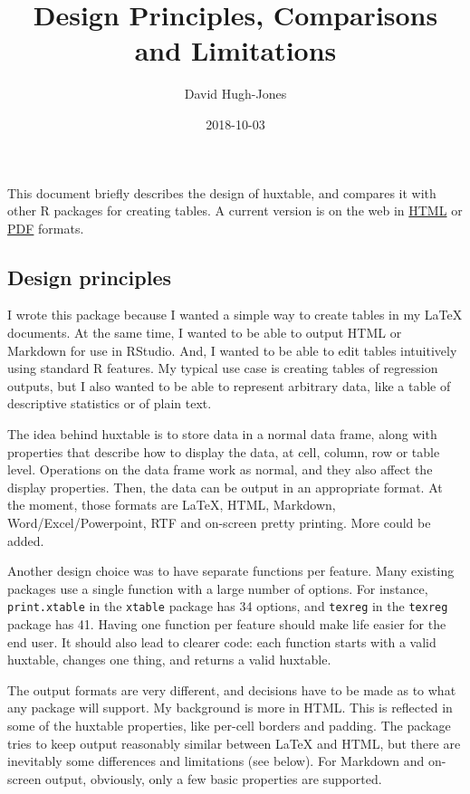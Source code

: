 \documentclass[]{article}
\title{Design Principles, Comparisons and Limitations}
\author{David Hugh-Jones}
\date{2018-10-03}
\begin{document}
\maketitle

This document briefly describes the design of huxtable, and compares it
with other R packages for creating tables. A current version is on the
web in
\href{http://hughjonesd.github.io/huxtable/design-principles.html}{HTML}
or
\href{http://hughjonesd.github.io/huxtable/design-principles.pdf}{PDF}
formats.

\subsection{Design principles}\label{design-principles}

I wrote this package because I wanted a simple way to create tables in
my LaTeX documents. At the same time, I wanted to be able to output HTML
or Markdown for use in RStudio. And, I wanted to be able to edit tables
intuitively using standard R features. My typical use case is creating
tables of regression outputs, but I also wanted to be able to represent
arbitrary data, like a table of descriptive statistics or of plain text.

The idea behind huxtable is to store data in a normal data frame, along
with properties that describe how to display the data, at cell, column,
row or table level. Operations on the data frame work as normal, and
they also affect the display properties. Then, the data can be output in
an appropriate format. At the moment, those formats are LaTeX, HTML,
Markdown, Word/Excel/Powerpoint, RTF and on-screen pretty printing. More
could be added.

Another design choice was to have separate functions per feature. Many
existing packages use a single function with a large number of options.
For instance, \texttt{print.xtable} in the \texttt{xtable} package has
34 options, and \texttt{texreg} in the \texttt{texreg} package has 41.
Having one function per feature should make life easier for the end
user. It should also lead to clearer code: each function starts with a
valid huxtable, changes one thing, and returns a valid huxtable.

The output formats are very different, and decisions have to be made as
to what any package will support. My background is more in HTML. This is
reflected in some of the huxtable properties, like per-cell borders and
padding. The package tries to keep output reasonably similar between
LaTeX and HTML, but there are inevitably some differences and
limitations (see below). For Markdown and on-screen output, obviously,
only a few basic properties are supported.
\end{document}
